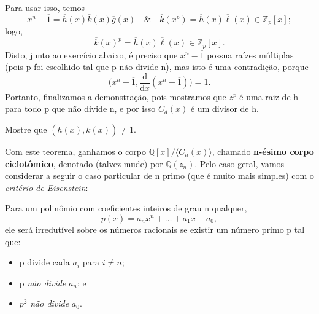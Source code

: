 \documentclass[../algebraIII_notes.tex]{subfiles}
\begin{document}
\begin{proof*}
	Para usar isso, temos
	\[
		x^{n}-\overline{1} =\overline{h}(x)\overline{k}(x)\overline{g}(x) \quad\&\quad \overline{k}(x^{p}) = \overline{h}(x)\overline{\ell }(x)\in \mathbb{Z}_{p}[x];
	\]
	logo,
	\[
		\overline{k}(x)^{p} = \overline{h}(x)\overline{\ell }(x)\in \mathbb{Z}_{p}[x].
	\]
	Disto, junto ao exercício abaixo, é preciso que \(x^{n}-\overline{1}\) possua raízes múltiplas (pois p foi escolhido tal que p não divide n), mas isto é uma contradição, porque
	\[
		\biggl(x^{n}-\overline{1}, \frac{\mathrm{d}}{\mathrm{d}x}(x^{n}-\overline{1})\biggr) = 1.
	\]
	Portanto, finalizamos a demonstração, pois mostramos que \(z^{p}\) é uma raiz de h para todo p que não divide n, e por isso \(C_{d}(x)\) é um divisor de h. \qedsymbol
\end{proof*}
\begin{exr}
	Mostre que \((\overline{h}(x), \overline{k}(x))\neq 1\).
\end{exr}
Com este teorema, ganhamos o corpo \(\mathbb{Q}[x]/\langle C_{n}(x) \rangle\), chamado \textbf{n-ésimo corpo ciclotômico}, denotado (talvez mude) por \(\mathbb{Q}(z_{n})\).
Pelo caso geral, vamos considerar a seguir o caso particular de n primo (que é muito mais simples) com o \textit{\hypertarget{eisenstein_criterion}{critério de Eisenstein}}:
\begin{prop*}
	Para um polinômio com coeficientes inteiros de grau n qualquer,
	\[
		p(x) = a_{n}x^{n} + \dotsc + a_1x + a_{0},
	\]
	ele será irredutível sobre os números racionais se existir um número primo p tal que:
	\begin{itemize}
		\item[i)] p divide cada \(a_{i}\) para \(i\neq n\);
		\item[ii)] p \textit{não divide} \(a_{n}\); e
		\item[iii)] \(p^{2}\) \textit{não divide} \(a_{0}\).
	\end{itemize}
\end{prop*}
\end{document}
